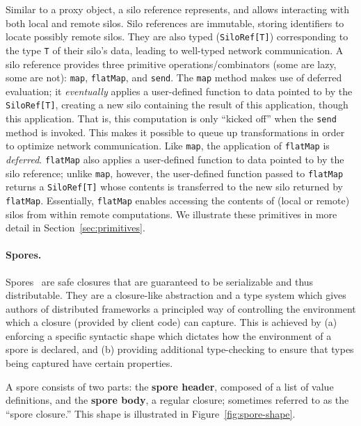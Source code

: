 \documentclass{jfp1}
\begin{document}
Similar to a proxy object, a silo reference represents, and allows interacting
with both local and remote silos. Silo references are immutable, storing
identifiers to locate possibly remote silos. They are also typed
(\verb|SiloRef[T]|) corresponding to the type \verb|T| of their silo's data,
leading to well-typed network communication. A silo reference provides three
primitive operations/combinators (some are lazy, some are not): \verb|map|,
\verb|flatMap|, and \verb|send|. The \verb|map| method makes use of deferred
evaluation; it {\em eventually} applies a user-defined function to data pointed
to by the \verb|SiloRef[T]|, creating a new silo containing the result of this
application, though this application. That is, this computation is only ``kicked
off'' when the \verb|send| method is invoked. This makes it possible to queue up
transformations in order to optimize network communication. Like \verb|map|, the
application of \verb|flatMap| is {\em deferred}. \verb|flatMap| also applies a
user-defined function to data pointed to by the silo reference; unlike
\verb|map|, however, the user-defined function passed to \verb|flatMap| returns
a \verb|SiloRef[T]| whose contents is transferred to the new silo returned by
\verb|flatMap|. Essentially, \verb|flatMap| enables accessing the contents of
(local or remote) silos from within remote computations. We illustrate these
primitives in more detail in Section~\ref{sec:primitives}.

\paragraph{Spores.}

Spores~\cite{Spores} are safe closures that are guaranteed to be serializable
and thus distributable. They are a closure-like abstraction and a type system
which gives authors of distributed frameworks a principled way of controlling
the environment which a closure (provided by client code) can capture. This is
achieved by (a) enforcing a specific syntactic shape which dictates how the
environment of a spore is declared, and (b) providing additional type-checking
to ensure that types being captured have certain properties.

\vspace{3mm}
\noindent A spore consists of two parts: the \textbf{spore header}, composed of
a list of value definitions, and the \textbf{spore body}, a regular closure;
sometimes referred to as the ``spore closure.'' This shape is illustrated in
Figure~\ref{fig:spore-shape}.
\end{document}
